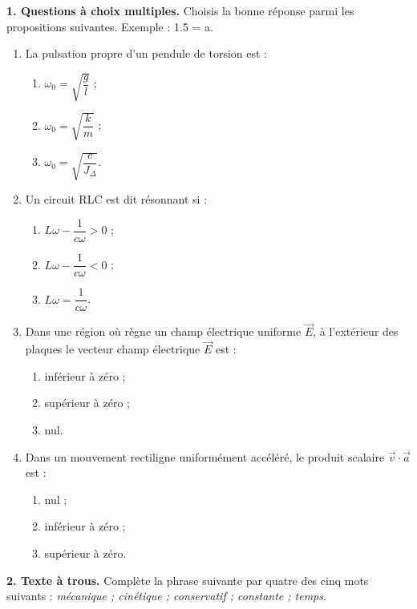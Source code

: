 \documentclass[11pt]{article}
\begin{document}


\noindent\textbf{1. Questions à choix multiples.} Choisis la bonne réponse parmi les propositions suivantes. Exemple : 1.5 = a.
\begin{enumerate}[label=1.\arabic*)]
  \item La pulsation propre d'un pendule de torsion est :
  \begin{enumerate}[label=\alph*)]
    \item $\omega_0 = \sqrt{\dfrac{g}{l}}$ ;
    \item $\omega_0 = \sqrt{\dfrac{k}{m}}$ ;
    \item $\omega_0 = \sqrt{\dfrac{c}{J_\Delta}}$.
  \end{enumerate}
  \item Un circuit RLC est dit résonnant si :
  \begin{enumerate}[label=\alph*)]
    \item $L\omega - \dfrac{1}{c\omega} > 0$ ;
    \item $L\omega - \dfrac{1}{c\omega} < 0$ ;
    \item $L\omega = \dfrac{1}{c\omega}$.
  \end{enumerate}
  \item Dans une région où règne un champ électrique uniforme $\vec{E}$, à l'extérieur des plaques le vecteur champ électrique $\vec{E}$ est :
  \begin{enumerate}[label=\alph*)]
    \item inférieur à zéro ;
    \item supérieur à zéro ;
    \item nul.
  \end{enumerate}
  \item Dans un mouvement rectiligne uniformément accéléré, le produit scalaire $\vec{v}\cdot\vec{a}$ est :
  \begin{enumerate}[label=\alph*)]
    \item nul ;
    \item inférieur à zéro ;
    \item supérieur à zéro.
  \end{enumerate}
\end{enumerate}

\medskip
\noindent\textbf{2. Texte à trous.} Complète la phrase suivante par quatre des cinq mots suivants : \textit{mécanique ; cinétique ; conservatif ; constante ; temps}.
\end{document}
